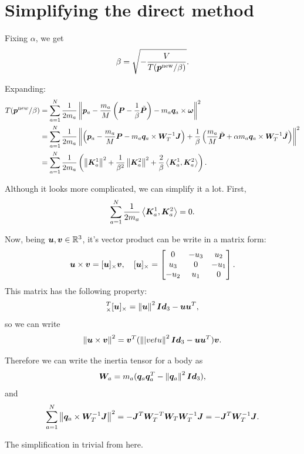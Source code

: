 \documentclass{article}
\begin{document}
\appendix
\section{Simplifying the direct method}\label{appendix:simplifying}
Fixing $\alpha$, we get
\begin{equation}
    \beta = \sqrt{- \dfrac{V}{T(\bm p^{\text{new}}/\beta)}}.
\end{equation}

Expanding:
\begin{align}
    T(\bm p^{\text new}/\beta) 
    &= \sum_{a=1}^N \dfrac{1}{2 m_a} \left\Vert \bm p_a - \dfrac{m_a}{M} \left(\bm P - \dfrac{1}{\beta} \tilde{\bm P}\right) - m_a \bm q_a \times \bm \omega \right\Vert^2 \nonumber \\
    &= \sum_{a=1}^N \dfrac{1}{2 m_a} \left\Vert \left(\bm p_a - \dfrac{m_a}{M} \bm P - m_a \bm q_a \times \bm W_T^{-1} \bm J\right) + \dfrac{1}{\beta} \left(\dfrac{m_a}{M} \tilde{\bm P} + \alpha m_a \bm q_a \times \bm W_T^{-1} \tilde{\bm J}\right) \right\Vert^2 \nonumber \\
    &= \sum_{a=1}^N \dfrac{1}{2 m_a} \left(\left\Vert \bm K_a^1 \right\Vert^2 + \dfrac{1}{\beta^2} \left\Vert \bm K_a^2 \right\Vert^2 + \dfrac{2}{\beta} \left\langle \bm K_a^1, \bm K_a^2 \right\rangle\right).
\end{align}

Although it looks more complicated, we can simplify it a lot. First,
\begin{equation}
    \sum_{a=1}^N \dfrac{1}{2m_a} \left\langle \bm K_a^1, \bm K_a^2 \right\rangle = 0.
\end{equation}

Now, being $\bm u, \bm v \in \mathbb{R}^3$, it's vector product can be write in a matrix form:
\begin{equation}
    \bm u \times \bm v = [\bm u]_{\times} \bm v,
    \quad
    [\bm u]_\times = \begin{bmatrix}
        0 & - u_3 & u_2 \\ u_3 & 0 & -u_1 \\ -u_2 & u_1 & 0
    \end{bmatrix}.
\end{equation}
This matrix has the following property:
\begin{equation}
    [\vet u]_\times^T [\vet u]_\times = \norma{\vet u}^2 \bm {Id}_3 - \vet u \vet u^T,
\end{equation}
so we can write
\begin{equation}
\left\Vert \bm u \times \bm v \right\Vert^2 = \bm v^T (\left\Vert |vet u \right\Vert^2 \bm{Id}_3 - \bm u \bm u^T) \bm v.
\end{equation}

Therefore we can write the inertia tensor for a body as
\begin{equation}
\bm W_a = m_a (\bm q_a \bm q_a^T - \left\Vert \bm q_a \right\Vert^2 \bm{Id}_3),
\end{equation}
and
\begin{equation}
\sum_{a=1}^N \left\Vert \bm q_a \times \bm W_T^{-1} \bm J \right\Vert^2
= - \bm J^T \bm W_T^{-T} \bm W_T \bm W_T^{-1} \bm J
= - \bm J^T \bm W_T^{-1} \bm J.
\end{equation}

The simplification in trivial from here.


\printbibliography
\end{document}
